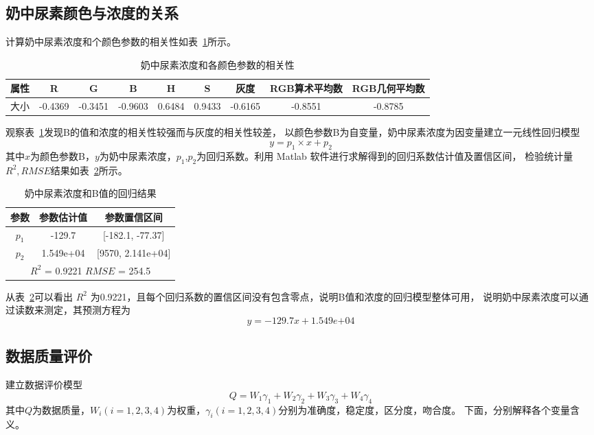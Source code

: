     \subsection{奶中尿素颜色与浓度的关系}
    计算奶中尿素浓度和个颜色参数的相关性如表~\ref{奶中尿素浓度相关性}所示。
    
    \begin{table}[H]
      \centering
      \caption{奶中尿素浓度和各颜色参数的相关性}
      \label{奶中尿素浓度相关性}
      \begin{tabular}{@{}ccccccccc@{}}
      \toprule
      属性 & R  & G & B & H & S&灰度 & RGB算术平均数 & RGB几何平均数\\ \midrule
      大小 & -0.4369 & -0.3451  &-0.9603 & 0.6484 &0.9433 & -0.6165 & -0.8551 & -0.8785\\ \bottomrule
      \end{tabular}
    \end{table}
    
    观察表~\ref{奶中尿素浓度相关性}发现B的值和浓度的相关性较强而与灰度的相关性较差，
    以颜色参数B为自变量，奶中尿素浓度为因变量建立一元线性回归模型
    $$ y = p_1 \times x + p_2$$
    其中$x$为颜色参数B，$y$为奶中尿素浓度，$p_1$,$p_2$为回归系数。利用 Matlab 软件进行求解得到的回归系数估计值及置信区间，
    检验统计量 $R^2, RMSE $结果如表~\ref{奶中尿素和B值回归}所示。
    
    \begin{table}[H]
      \centering
      \caption{奶中尿素浓度和B值的回归结果}
      \label{奶中尿素和B值回归}
      \begin{tabular}{@{}ccc@{}}
      \toprule
      参数       & 参数估计值      & 参数置信区间                   \\ \midrule
      $p_1$     & -129.7     & {[}-182.1, -77.37{]}     \\
      $p_2$     & 1.549e+04   & {[}9570, 2.141e+04{]}    \\
      \hline
      \multicolumn{3}{c}{$R^2$ = 0.9221   $RMSE$ = 254.5} \\ \bottomrule
      \end{tabular}
    \end{table}
    
    从表~\ref{奶中尿素和B值回归}可以看出 $R^2$ 为0.9221，且每个回归系数的置信区间没有包含零点，说明B值和浓度的回归模型整体可用，
    说明奶中尿素浓度可以通过读数来测定，其预测方程为
    $$ y = -129.7x + 1.549e{+04}$$
    
    \subsection{数据质量评价}
    建立数据评价模型
    $$Q=W_1\gamma_1+W_2\gamma_2+W_3\gamma_3+W_4\gamma_4$$
    其中$Q$为数据质量，$W_i (i=1,2,3,4) $为权重，$\gamma_{i} (i=1,2,3,4)$分别为准确度，稳定度，区分度，吻合度。
    下面，分别解释各个变量含义。

